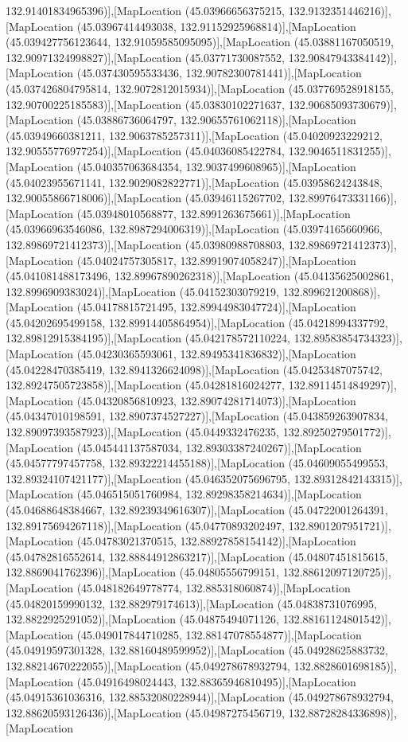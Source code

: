132.91401834965396)],[MapLocation (45.03966656375215, 132.9132351446216)],[MapLocation (45.03967414493038, 132.91152925968814)],[MapLocation (45.039427756123644, 132.91059585095095)],[MapLocation (45.03881167050519, 132.90971324998827)],[MapLocation (45.03771730087552, 132.90847943384142)],[MapLocation (45.037430595533436, 132.90782300781441)],[MapLocation (45.037426804795814, 132.9072812015934)],[MapLocation (45.037769528918155, 132.90700225185583)],[MapLocation (45.03830102271637, 132.90685093730679)],[MapLocation (45.03886736064797, 132.90655761062118)],[MapLocation (45.03949660381211, 132.9063785257311)],[MapLocation (45.04020923229212, 132.90555776977254)],[MapLocation (45.04036085422784, 132.9046511831255)],[MapLocation (45.040357063684354, 132.9037499608965)],[MapLocation (45.04023955671141, 132.9029082822771)],[MapLocation (45.03958624243848, 132.90055866718006)],[MapLocation (45.03946115267702, 132.89976473331166)],[MapLocation (45.03948010568877, 132.8991263675661)],[MapLocation (45.03966963546086, 132.8987294006319)],[MapLocation (45.03974165660966, 132.89869721412373)],[MapLocation (45.03980988708803, 132.89869721412373)],[MapLocation (45.04024757305817, 132.89919074058247)],[MapLocation (45.041081488173496, 132.89967890262318)],[MapLocation (45.04135625002861, 132.8996909383024)],[MapLocation (45.04152303079219, 132.899621200868)],[MapLocation (45.04178815721495, 132.89944983047724)],[MapLocation (45.04202695499158, 132.89914405864954)],[MapLocation (45.04218994337792, 132.89812915384195)],[MapLocation (45.042178572110224, 132.89583854734323)],[MapLocation (45.04230365593061, 132.89495341836832)],[MapLocation (45.04228470385419, 132.8941326624098)],[MapLocation (45.04253487075742, 132.89247505723858)],[MapLocation (45.04281816024277, 132.89114514849297)],[MapLocation (45.04320856810923, 132.89074281714073)],[MapLocation (45.04347010198591, 132.8907374527227)],[MapLocation (45.043859263907834, 132.89097393587923)],[MapLocation (45.0449332476235, 132.89250279501772)],[MapLocation (45.045441137587034, 132.89303387240267)],[MapLocation (45.04577797457758, 132.89322214455188)],[MapLocation (45.04609055499553, 132.89324107421177)],[MapLocation (45.046352075696795, 132.89312842143315)],[MapLocation (45.046515051760984, 132.89298358214634)],[MapLocation (45.04688648384667, 132.89239349616307)],[MapLocation (45.04722001264391, 132.89175694267118)],[MapLocation (45.04770893202497, 132.8901207951721)],[MapLocation (45.04783021370515, 132.88927858154142)],[MapLocation (45.04782816552614, 132.88844912863217)],[MapLocation (45.04807451815615, 132.8869041762396)],[MapLocation (45.04805556799151, 132.88612097120725)],[MapLocation (45.048182649778774, 132.885318060874)],[MapLocation (45.04820159990132, 132.882979174613)],[MapLocation (45.04838731076995, 132.8822925291052)],[MapLocation (45.04875494071126, 132.88161124801542)],[MapLocation (45.049017844710285, 132.88147078554877)],[MapLocation (45.04919597301328, 132.88160489599952)],[MapLocation (45.04928625883732, 132.88214670222055)],[MapLocation (45.049278678932794, 132.8828601698185)],[MapLocation (45.04916498024443, 132.88365946810495)],[MapLocation (45.04915361036316, 132.88532080228944)],[MapLocation (45.049278678932794, 132.88620593126436)],[MapLocation (45.04987275456719, 132.88728284336898)],[MapLocation 